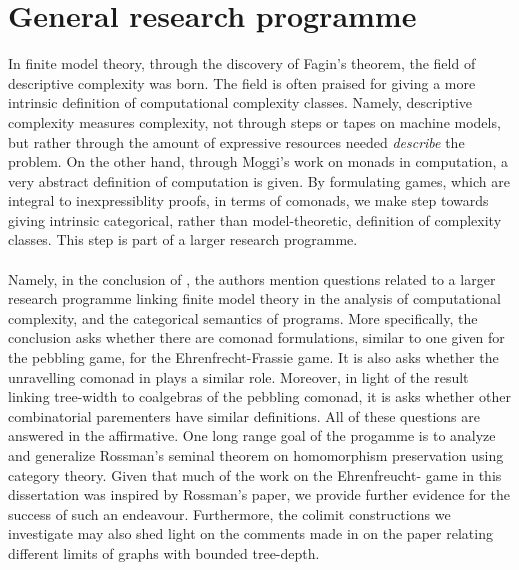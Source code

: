 \section{General research programme}
In finite model theory, through the discovery of Fagin's theorem, the field of descriptive complexity was born. The field is often praised for giving a more intrinsic definition of computational complexity classes. Namely, descriptive complexity measures complexity, not through steps or tapes on machine models, but rather through the amount of expressive resources needed \textit{describe} the problem. On the other hand, through Moggi's work on monads in computation, a very abstract definition of computation is given. By formulating games, which are integral to inexpressiblity proofs, in terms of comonads, we make step towards giving intrinsic categorical, rather than model-theoretic, definition of complexity classes. This step is part of a larger research programme. \\~\\
Namely, in the conclusion of \cite{Abramsky2017}, the authors mention questions related to a larger research programme linking finite model theory in the analysis of computational complexity, and the categorical semantics of programs. More specifically, the conclusion asks whether there are comonad formulations, similar to one given for the pebbling game, for the Ehrenfrecht-Frassie game. It is also asks whether the unravelling comonad in \cite{Gradel2014} plays a similar role. Moreover, in light of the result linking tree-width to coalgebras of the pebbling comonad, it is asks whether other combinatorial parementers have similar definitions. All of these questions are answered in the affirmative. One long range goal of the progamme is to analyze and generalize Rossman's seminal theorem on homomorphism preservation using category theory. Given that much of the work on the Ehrenfreucht-{\Fraisse} game in this dissertation was inspired by Rossman's paper, we provide further evidence for the success of such an endeavour. Furthermore, the colimit constructions we investigate may also shed light on the comments made in \cite{Abramsky2017} on the paper \cite{Nesetril2013} relating different limits of graphs with bounded tree-depth. 
